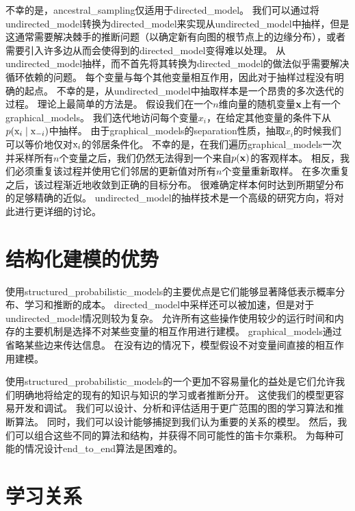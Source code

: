 不幸的是，\gls{ancestral_sampling}仅适用于\gls{directed_model}。 
我们可以通过将\gls{undirected_model}转换为\gls{directed_model}来实现从\gls{undirected_model}中抽样，但是这通常需要解决棘手的推断问题（以确定新有向图的根节点上的边缘分布），或者需要引入许多边从而会使得到的\gls{directed_model}变得难以处理。
从\gls{undirected_model}抽样，而不首先将其转换为\gls{directed_model}的做法似乎需要解决循环依赖的问题。 
每个变量与每个其他变量相互作用，因此对于抽样过程没有明确的起点。
不幸的是，从\gls{undirected_model}中抽取样本是一个昂贵的多次迭代的过程。
理论上最简单的方法是。
假设我们在一个$n$维向量的随机变量$\mathbf{x}$上有一个\gls{graphical_models}。 
我们迭代地访问每个变量$x_i$，在给定其他变量的条件下从$p(\mathrm{x}_i \mid \mathrm{x}_{-i})$中抽样。
由于\gls{graphical_models}的\gls{separation}性质，抽取$x_i$的时候我们可以等价地仅对$\mathrm{x}_i$的邻居条件化。
不幸的是，在我们遍历\gls{graphical_models}一次并采样所有$n$个变量之后，我们仍然无法得到一个来自$p(\mathbf{x})$的客观样本。
相反，我们必须重复该过程并使用它们邻居的更新值对所有$n$个变量重新取样。
在多次重复之后，该过程渐近地收敛到正确的目标分布。
很难确定样本何时达到所期望分布的足够精确的近似。
\gls{undirected_model}的抽样技术是一个高级的研究方向，将对此进行更详细的讨论。




\section{结构化建模的优势}
\label{sec:advantages_of_structured_modelling}


使用\gls{structured_probabilistic_models}的主要优点是它们能够显著降低表示概率分布、学习和推断的成本。
\gls{directed_model}中采样还可以被加速，但是对于\gls{undirected_model}情况则较为复杂。
允许所有这些操作使用较少的运行时间和内存的主要机制是选择不对某些变量的相互作用进行建模。
\gls{graphical_models}通过省略某些边来传达信息。
在没有边的情况下，模型假设不对变量间直接的相互作用建模。


使用\gls{structured_probabilistic_models}的一个更加不容易量化的益处是它们允许我们明确地将给定的现有的知识与知识的学习或者推断分开。
这使我们的模型更容易开发和调试。 
我们可以设计、分析和评估适用于更广范围的图的学习算法和推断算法。
同时，我们可以设计能够捕捉到我们认为重要的关系的模型。
然后，我们可以组合这些不同的算法和结构，并获得不同可能性的笛卡尔乘积。
为每种可能的情况设计\gls{end_to_end}算法是困难的。



\section{学习关系}
\label{sec:learning_about_dependencies}

